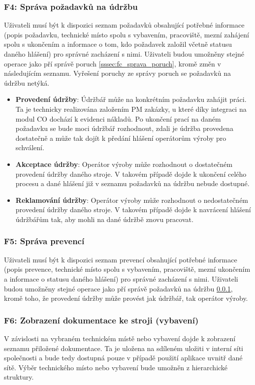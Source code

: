 \documentclass[thesis=M,czech]{FITthesis}[2012/06/26]
\begin{document}
\subsubsection{F4: Správa požadavků na údržbu}
\label{sssec:fc_sprava_poz_udr}
Uživateli musí být k dispozici seznam požadavků obsahující potřebné informace (popis požadavku, technické místo spolu s vybavením, pracoviště, mezní zahájení spolu s ukončením a informace o tom, kdo požadavek založil včetně statusu daného hlášení) pro správné zacházení s nimi. Uživateli budou umožněny stejné operace jako pří správě poruch \ref{sssec:fc_sprava_poruch}, kromě změn v následujícím seznamu. Vyřešení poruchy ze správy poruch se požadavků na údržbu netýká.
\begin{itemize}
	\item
	\textbf{Provedení údržby}: Údržbář může na konkrétním požadavku zahájit práci. Ta je technicky realizována založením PM zakázky, u které díky integraci na modul CO dochází k evidenci nákladů. Po ukončení prací na daném požadavku se bude moci údržbář rozhodnout, zdali je údržba provedena dostatečně a může tak dojít k předání hlášení operátorům výroby pro schválení. 
	\item
	\textbf{Akceptace údržby}: Operátor výroby může rozhodnout o dostatečném provedení údržby daného stroje. V takovém případě dojde k ukončení celého procesu a dané hlášení již v seznamu požadavků na údržbu nebude dostupné.
	\item
	\textbf{Reklamování údržby}: Operátor výroby může rozhodnout o nedostatečném provedení údržby daného stroje. V takovém případě dojde k navrácení hlášení údržbářům tak, aby mohli na dané údržbě znovu pracovat.
\end{itemize} 
\subsubsection{F5: Správa prevencí}
\label{sssec:fc_sprava_prev}
Uživateli musí být k dispozici seznam prevencí obsahující potřebné informace (popis prevence, technické místo spolu s vybavením, pracoviště, mezní ukončením a informace o statusu daného hlášení) pro správné zacházení s nimi. Uživateli budou umožněny stejné operace jako pří správě požadavků na údržbu \ref{sssec:fc_sprava_poz_udr}, kromě toho, že provedení údržby může provést jak údržbář, tak operátor výroby. 
\subsubsection{F6: Zobrazení dokumentace ke stroji (vybavení)}
\label{sssec:fc_zobrazeni_dokumentace}
V závislosti na vybraném technickém místě nebo vybavení dojde k zobrazení seznamu přiložené dokumentace. Ta je uložena na sdíleném uložiti v interní síti společnosti a bude tedy dostupná pouze v případě použití aplikace uvnitř dané sítě. Výběr technického místo nebo vybavení bude umožněn z hierarchické struktury.
\end{document}
